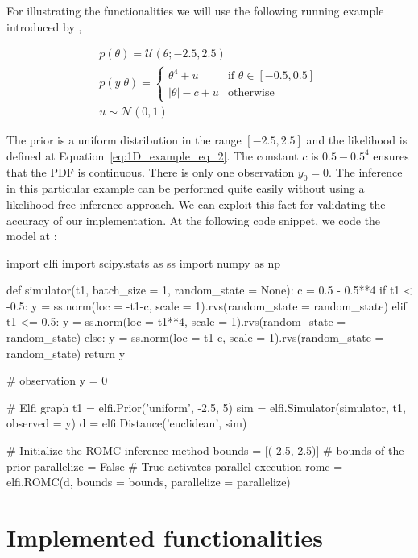 \documentclass[article, shortnames]{jss}
\begin{document}
For illustrating the functionalities we will use the following running
example introduced by \citet{Ikonomov2019},

\begin{gather} \label{eq:1D_example}
  p(\theta) = \mathcal{U}(\theta;-2.5,2.5)\\ \label{eq:1D_example_eq_2}
  p(y|\theta) = \left\{
    \begin{array}{ll} \theta^4 + u & \mbox{if } \theta \in [-0.5, 0.5]
\\ |\theta| - c + u & \mbox{otherwise}
    \end{array} \right.\\
  u \sim \mathcal{N}(0,1)
\end{gather}

\noindent

The prior is a uniform distribution in the range \([-2.5, 2.5]\) and
the likelihood is defined at Equation~\ref{eq:1D_example_eq_2}. The
constant \(c\) is \(0.5 - 0.5^4\) ensures that the PDF is
continuous. There is only one observation \(y_0 = 0\). The inference
in this particular example can be performed quite easily without using
a likelihood-free inference approach. We can exploit this fact for
validating the accuracy of our implementation. At the following code
snippet, we code the model at :

\begin{Code}
import elfi
import scipy.stats as ss
import numpy as np

def simulator(t1, batch_size = 1, random_state = None):
    c = 0.5 - 0.5**4
    if t1 < -0.5:
        y = ss.norm(loc = -t1-c, scale = 1).rvs(random_state = random_state)
    elif t1 <= 0.5:
        y = ss.norm(loc = t1**4, scale = 1).rvs(random_state = random_state)
    else:
        y = ss.norm(loc = t1-c, scale = 1).rvs(random_state = random_state)
    return y

# observation
y = 0

# Elfi graph
t1 = elfi.Prior('uniform', -2.5, 5)
sim = elfi.Simulator(simulator, t1, observed = y)
d = elfi.Distance('euclidean', sim)

# Initialize the ROMC inference method
bounds = [(-2.5, 2.5)] # bounds of the prior
parallelize = False # True activates parallel execution
romc = elfi.ROMC(d, bounds = bounds, parallelize = parallelize)
\end{Code}


\section{Implemented functionalities}
\end{document}
